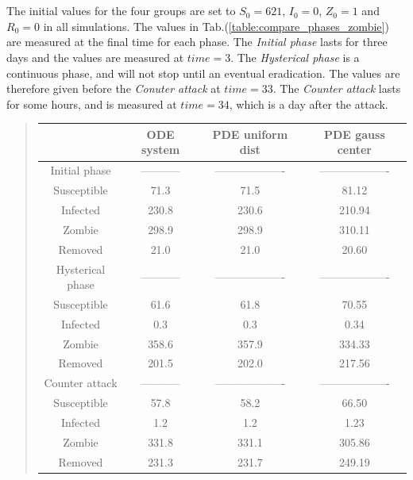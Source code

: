 \documentclass[%
twoside,                 %
final,                   %
10pt]{article}
\begin{document}
\\
\\
The initial values for the four groups are set to $S_0=621$, $I_0=0$, $Z_0=1$ and $R_0= 0$ in all simulations. The values in Tab.(\ref{table:compare_phases_zombie}) are measured at the final time for each phase. The \emph{Initial phase} lasts for three days and the values are measured at $time=3$. The \emph{Hysterical phase} is a continuous phase, and will not stop until an eventual eradication. The values are therefore given before the \emph{Conuter attack} at $time=33$. The \emph{Counter attack} lasts for some hours, and is measured at $time=34$, which is a day after the attack. 

\label{table:compare_phases_zombie}

\begin{quote}
\begin{tabular}{cccc}
\hline
\multicolumn{1}{c}{  } & \multicolumn{1}{c}{ ODE system } & \multicolumn{1}{c}{ PDE uniform dist } & \multicolumn{1}{c}{ PDE gauss center } \\
\hline
Initial phase       & -----------         & ------------------- & ------------------- \\
\hline
Susceptible         & 71.3                & 71.5                & 81.12               \\
Infected            & 230.8               & 230.6               & 210.94              \\
Zombie              & 298.9               & 298.9               & 310.11              \\
Removed             & 21.0                & 21.0                & 20.60               \\
\hline
Hysterical phase    & -----------         & ------------------- & ------------------- \\
\hline
Susceptible         & 61.6                & 61.8                & 70.55               \\
Infected            & 0.3                 & 0.3                 & 0.34                \\
Zombie              & 358.6               & 357.9               & 334.33              \\
Removed             & 201.5               & 202.0               & 217.56              \\
\hline
Counter attack      & -----------         & ------------------- & ------------------- \\
\hline
Susceptible         & 57.8                & 58.2                & 66.50               \\
Infected            & 1.2                 & 1.2                 & 1.23                \\
Zombie              & 331.8               & 331.1               & 305.86              \\
Removed             & 231.3               & 231.7               & 249.19              \\
\hline
\end{tabular}
\end{quote}
\end{document}
